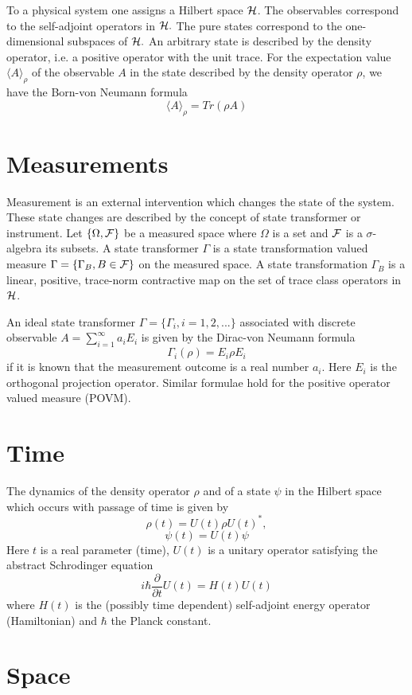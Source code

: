 \documentclass[12pt]{article}
\begin{document}
To a physical system one assigns a Hilbert space ${\cal H}$. The
observables correspond  to the self-adjoint operators in ${\cal
H}.$ The pure states correspond  to the one-dimensional subspaces
of ${\cal H}.$ An arbitrary state is described by the density
operator, i.e. a positive operator with the unit trace. For the
expectation value $\langle A \rangle_{\rho}$ of the observable $A$ in the state
described by the density operator $\rho$, we have the Born-von
Neumann formula
$$
\langle A \rangle_{\rho}=Tr (\rho A)
$$

\section{Measurements}

Measurement is an external intervention which changes the state of
the system. These state changes are described by the concept of
state transformer or instrument. Let $\{\Omega,{\cal F}\}$ be a
measured space where $\Omega$ is a set and ${\cal F}$ is a
$\sigma$-algebra its subsets. A state transformer $\Gamma$ is a
state transformation valued measure $\Gamma =\{\Gamma_B, B\in
{\cal F} \}$ on the measured space. A state transformation
$\Gamma_B$ is a linear, positive, trace-norm contractive map on
the set of trace class operators in ${\cal H}$.

An ideal state transformer $\Gamma =\{\Gamma_i, i=1,2,... \}$
associated with discrete observable $A=\sum_{i=1}^{\infty} a_iE_i$
is given by the Dirac-von Neumann formula
$$
\Gamma_i(\rho)= E_i\rho E_i
$$
if it is known that the measurement outcome is a real number
$a_i.$ Here $E_i$ is the orthogonal projection operator. Similar
formulae hold for the positive operator valued  measure (POVM).

\section{Time}

The dynamics of the density operator $\rho$ and of a state $\psi$
in the Hilbert space which occurs with passage of time is given by
$$
\rho(t)=U(t)\rho U(t)^*,
$$
$$
\psi (t)=U(t)\psi
$$
Here $t$ is a real  parameter (time), $U(t)$ is a unitary operator
satisfying the abstract Schrodinger equation
$$
i\hbar \frac{\partial}{\partial t}U(t)=H(t)U(t)
$$
where $H(t)$ is the (possibly time dependent) self-adjoint energy
operator (Hamiltonian) and $\hbar$ the Planck constant.

\section{Space}
\end{document}
